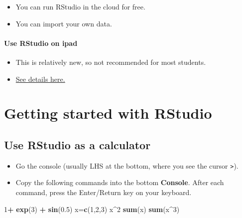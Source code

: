\documentclass[]{article}
\newenvironment{Shaded}{\begin{snugshade}}{\end{snugshade}}
\newcommand{\DecValTok}[1]{\textcolor[rgb]{0.00,0.00,0.81}{#1}}
\newcommand{\FloatTok}[1]{\textcolor[rgb]{0.00,0.00,0.81}{#1}}
\newcommand{\KeywordTok}[1]{\textcolor[rgb]{0.13,0.29,0.53}{\textbf{#1}}}
\newcommand{\NormalTok}[1]{#1}
\newcommand{\OperatorTok}[1]{\textcolor[rgb]{0.81,0.36,0.00}{\textbf{#1}}}
\newcommand{\StringTok}[1]{\textcolor[rgb]{0.31,0.60,0.02}{#1}}
\providecommand{\tightlist}{%
  \setlength{\itemsep}{0pt}\setlength{\parskip}{0pt}}
\let\oldparagraph\paragraph
\renewcommand{\paragraph}[1]{\oldparagraph{#1}\mbox{}}
\begin{document}
\begin{itemize}
\tightlist
\item
  You can run RStudio in the cloud for free.
\item
  You can import your own data.
\end{itemize}

\hypertarget{use-rstudio-on-ipad}{%
\paragraph{Use RStudio on ipad}\label{use-rstudio-on-ipad}}

\begin{itemize}
\tightlist
\item
  This is relatively new, so not recommended for most students.
\item
  \href{https://levelup.gitconnected.com/using-rstudio-with-an-ipad-cb9f013bb3f}{See details here.}
\end{itemize}

\hypertarget{gettingstarted}{%
\section{Getting started with RStudio}\label{gettingstarted}}

\hypertarget{use-rstudio-as-a-calculator}{%
\subsection{Use RStudio as a calculator}\label{use-rstudio-as-a-calculator}}

\begin{itemize}
\tightlist
\item
  Go the console (usually LHS at the bottom, where you see the cursor \texttt{\textgreater{}}).
\end{itemize}

\begin{itemize}
\tightlist
\item
  Copy the following commands into the bottom \textbf{Console}. After each command, press the Enter/Return key on your keyboard.
\end{itemize}

\begin{Shaded}
\begin{Highlighting}[]
\DecValTok{1}\OperatorTok{+}\StringTok{ }\KeywordTok{exp}\NormalTok{(}\DecValTok{3}\NormalTok{) }\OperatorTok{+}\StringTok{ }\KeywordTok{sin}\NormalTok{(}\FloatTok{0.5}\NormalTok{)}
\NormalTok{x=}\KeywordTok{c}\NormalTok{(}\DecValTok{1}\NormalTok{,}\DecValTok{2}\NormalTok{,}\DecValTok{3}\NormalTok{)}
\NormalTok{x}\OperatorTok{^}\DecValTok{2}
\KeywordTok{sum}\NormalTok{(x)}
\KeywordTok{sum}\NormalTok{(x}\OperatorTok{^}\DecValTok{3}\NormalTok{)}
\end{Highlighting}
\end{Shaded}
\end{document}
